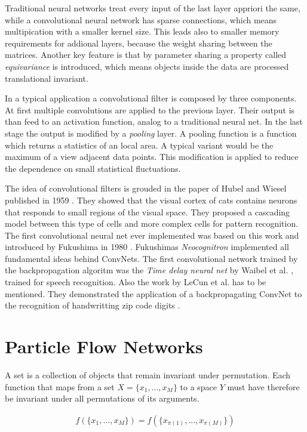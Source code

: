 \documentclass[12pt, a4paper]{thesis}
\begin{document}
Traditional neural networks treat every input of the last layer
appriori the same, while a convolutional neural network has sparse
connections, which means multipication with a smaller kernel
size. This leads also to smaller memory requirements for addional
layers, because the weight sharing between the matrices.  Another key
feature is that by parameter sharing a property called
\emph{equivariance} is introduced, which means objects inside the data
are processed translational invariant.

In a typical application a convolutional filter is composed by three components.
At first multiple convolutions are applied to the previous layer. Their output
is than feed to an activation function, analog to a traditional neural net.  In
the last stage the output is modified by a \emph{pooling} layer. A pooling function
is a function which returns a statistics of an local area. A typical variant
would be the maximum of a view adjacent data points. This modification is
applied to reduce the dependence on small statistical fluctuations.

The idea of convolutional filters is grouded in the paper of Hubel and
Wiesel published in 1959 \cite{hubel59}. They showed that the visual
cortex of cats contains neurons that responds to small regions of the
visual space. They proposed a cascading model between this type of
cells and more complex cells for pattern recognition. The first
convolutional neural net ever implemented was based on this work and
introduced by Fukushima in 1980 \cite{neocognitron}. Fukushimas
\emph{Neocognitron} implemented all fundamental ideas behind ConvNets.
The first convolutional network trained by the backpropagation
algoritm was the \emph{Time delay neural net} by Waibel et
al. \cite{hampshire89,waibel90}, trained for speech recognition. Also
the work by LeCun et al. has to be mentioned. They demonstrated the
application of a backpropagating ConvNet to the recognition of
handwritting zip code digits \cite{lecun89}.

\section{Particle Flow Networks}
\label{sec:orgde973b7}

A set is a collection of objects that remain invariant under permutation. Each function that maps from a set \(X = \{x_1, ... , x_M \}\) to a space \(Y\) must have
therefore be invariant under all permutations of its arguments.

\begin{align}
f(\{x_1, ... , x_M \}) = f(\{x_{\pi(1)}, ... , x_{\pi(M)}\})
\end{align}
\end{document}
